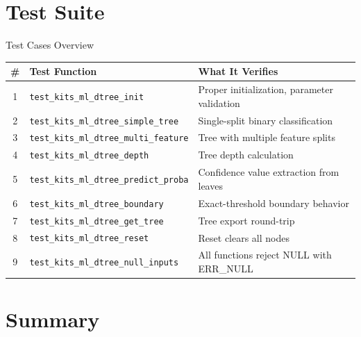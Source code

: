 \documentclass[aspectratio=169, 10pt]{beamer}
\begin{document}
\section{Test Suite}

\begin{frame}{Test Cases Overview}
\begin{table}
\centering
\small
\begin{tabular}{@{}clp{7cm}@{}}
\toprule
\textbf{\#} & \textbf{Test Function} & \textbf{What It Verifies} \\
\midrule
1 & \texttt{test\_kits\_ml\_dtree\_init}
  & Proper initialization, parameter validation \\
2 & \texttt{test\_kits\_ml\_dtree\_simple\_tree}
  & Single-split binary classification \\
3 & \texttt{test\_kits\_ml\_dtree\_multi\_feature}
  & Tree with multiple feature splits \\
4 & \texttt{test\_kits\_ml\_dtree\_depth}
  & Tree depth calculation \\
5 & \texttt{test\_kits\_ml\_dtree\_predict\_proba}
  & Confidence value extraction from leaves \\
6 & \texttt{test\_kits\_ml\_dtree\_boundary}
  & Exact-threshold boundary behavior \\
7 & \texttt{test\_kits\_ml\_dtree\_get\_tree}
  & Tree export round-trip \\
8 & \texttt{test\_kits\_ml\_dtree\_reset}
  & Reset clears all nodes \\
9 & \texttt{test\_kits\_ml\_dtree\_null\_inputs}
  & All functions reject NULL with ERR\_NULL \\
\bottomrule
\end{tabular}
\end{table}
\end{frame}

\section{Summary}
\end{document}
